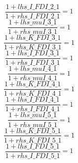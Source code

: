 \begin{dmath}
\frac{1+{lhs\_I\_FDI\_2\_1}}{1+{rhs\_I\_FDI\_2\_1}}=1
\end{dmath}
\begin{dmath}
\frac{1+{lhs\_muI\_3\_1}}{1+{rhs\_muI\_3\_1}}=1
\end{dmath}
\begin{dmath}
\frac{1+{lhs\_K\_FDI\_3\_1}}{1+{rhs\_K\_FDI\_3\_1}}=1
\end{dmath}
\begin{dmath}
\frac{1+{lhs\_I\_FDI\_3\_1}}{1+{rhs\_I\_FDI\_3\_1}}=1
\end{dmath}
\begin{dmath}
\frac{1+{lhs\_muI\_4\_1}}{1+{rhs\_muI\_4\_1}}=1
\end{dmath}
\begin{dmath}
\frac{1+{lhs\_K\_FDI\_4\_1}}{1+{rhs\_K\_FDI\_4\_1}}=1
\end{dmath}
\begin{dmath}
\frac{1+{lhs\_I\_FDI\_4\_1}}{1+{rhs\_I\_FDI\_4\_1}}=1
\end{dmath}
\begin{dmath}
\frac{1+{lhs\_muI\_5\_1}}{1+{rhs\_muI\_5\_1}}=1
\end{dmath}
\begin{dmath}
\frac{1+{lhs\_K\_FDI\_5\_1}}{1+{rhs\_K\_FDI\_5\_1}}=1
\end{dmath}
\begin{dmath}
\frac{1+{lhs\_I\_FDI\_5\_1}}{1+{rhs\_I\_FDI\_5\_1}}=1
\end{dmath}
